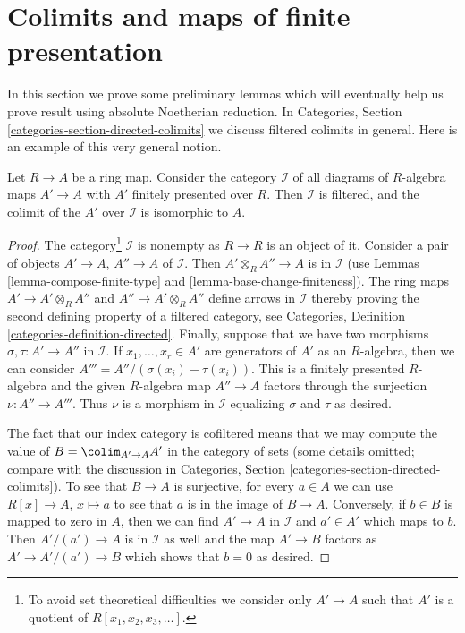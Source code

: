\section{Colimits and maps of finite presentation}
\label{section-colimits-flat}

\noindent
In this section we prove some preliminary lemmas
which will eventually help us prove result using
absolute Noetherian reduction.
In Categories, Section \ref{categories-section-directed-colimits}
we discuss filtered colimits in general.
Here is an example of this very general notion.

\begin{lemma}
\label{lemma-ring-colimit-fp-category}
Let $R \to A$ be a ring map. Consider the category $\mathcal{I}$ of all
diagrams of $R$-algebra maps $A' \to A$ with $A'$ finitely presented over
$R$. Then $\mathcal{I}$ is filtered, and the colimit of the $A'$ over
$\mathcal{I}$ is isomorphic to $A$.
\end{lemma}

\begin{proof}
The category\footnote{To avoid set theoretical difficulties we
consider only $A' \to A$ such that $A'$ is a quotient of
$R[x_1, x_2, x_3, \ldots]$.}
$\mathcal{I}$ is nonempty as $R \to R$ is an object of it.
Consider a pair of objects $A' \to A$, $A'' \to A$ of $\mathcal{I}$.
Then $A' \otimes_R A'' \to A$ is in
$\mathcal{I}$ (use Lemmas \ref{lemma-compose-finite-type} and
\ref{lemma-base-change-finiteness}). The ring maps
$A' \to A' \otimes_R A''$ and $A'' \to A' \otimes_R A''$
define arrows in $\mathcal{I}$ thereby proving the second defining
property of a filtered category, see
Categories, Definition \ref{categories-definition-directed}.
Finally, suppose that we have two morphisms $\sigma, \tau : A' \to A''$
in $\mathcal{I}$. If $x_1, \ldots, x_r \in A'$ are generators of
$A'$ as an $R$-algebra, then we can consider
$A''' = A''/(\sigma(x_i) - \tau(x_i))$.
This is a finitely presented $R$-algebra and the given $R$-algebra map
$A'' \to A$ factors through the surjection $\nu : A'' \to A'''$.
Thus $\nu$ is a morphism in $\mathcal{I}$ equalizing $\sigma$ and $\tau$
as desired.

\medskip\noindent
The fact that our index category is cofiltered means that we may
compute the value of $B = \colim_{A' \to A} A'$ in the category of sets
(some details omitted; compare with the discussion in
Categories, Section \ref{categories-section-directed-colimits}).
To see that $B \to A$ is surjective, for
every $a \in A$ we can use $R[x] \to A$, $x \mapsto a$ to see that
$a$ is in the image of $B \to A$. Conversely, if $b \in B$ is mapped
to zero in $A$, then we can find $A' \to A$ in $\mathcal{I}$ and
$a' \in A'$ which maps to $b$. Then $A'/(a') \to A$ is in $\mathcal{I}$
as well and the map $A' \to B$ factors as $A' \to A'/(a') \to B$
which shows that $b = 0$ as desired.
\end{proof}

